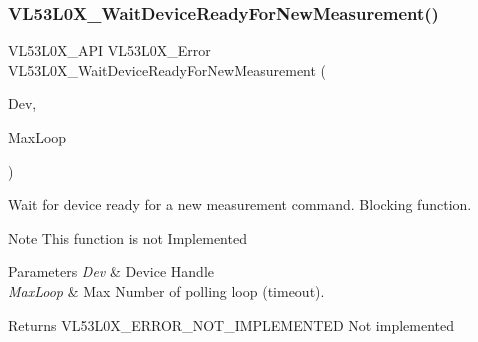 \subsubsection{\texorpdfstring{V\+L53\+L0\+X\+\_\+\+Wait\+Device\+Ready\+For\+New\+Measurement()}{VL53L0X\_WaitDeviceReadyForNewMeasurement()}}
{\footnotesize\ttfamily V\+L53\+L0\+X\+\_\+\+A\+PI V\+L53\+L0\+X\+\_\+\+Error V\+L53\+L0\+X\+\_\+\+Wait\+Device\+Ready\+For\+New\+Measurement (\begin{DoxyParamCaption}\item[{\hyperlink{group__VL53L0X__platform__group_ga2d6405308b1dd524b462f1b8fb97d167}{V\+L53\+L0\+X\+\_\+\+D\+EV}}]{Dev,  }\item[{\hyperlink{vl53l0x__types_8h_a435d1572bf3f880d55459d9805097f62}{uint32\+\_\+t}}]{Max\+Loop }\end{DoxyParamCaption})}



Wait for device ready for a new measurement command. Blocking function. 

\begin{DoxyNote}{Note}
This function is not Implemented
\end{DoxyNote}

\begin{DoxyParams}{Parameters}
{\em Dev} & Device Handle \\
\hline
{\em Max\+Loop} & Max Number of polling loop (timeout). \\
\hline
\end{DoxyParams}
\begin{DoxyReturn}{Returns}
V\+L53\+L0\+X\+\_\+\+E\+R\+R\+O\+R\+\_\+\+N\+O\+T\+\_\+\+I\+M\+P\+L\+E\+M\+E\+N\+T\+ED Not implemented 
\end{DoxyReturn}
